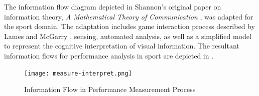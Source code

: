 The information flow diagram depicted in Shannon's
original paper on information theory, \textit{A Mathematical Theory of Communication} \cite{Shannon1948}, was adapted for the sport domain. The adaptation includes game interaction process described by Lames and McGarry \cite{lames2007search}, sensing, automated analysis,
as well as a
simplified model to represent the cognitive interpretation of visual
information. The resultant information flows for performance analysis in
sport are depicted in .

\begin{landscape}

\begin{figure}[htbp]
\centering
\texttt{[image: measure-interpret.png]}
\caption{Information Flow in Performance Measurement Process
\label{fig:measure-interpret}}
\end{figure}

\end{landscape}

